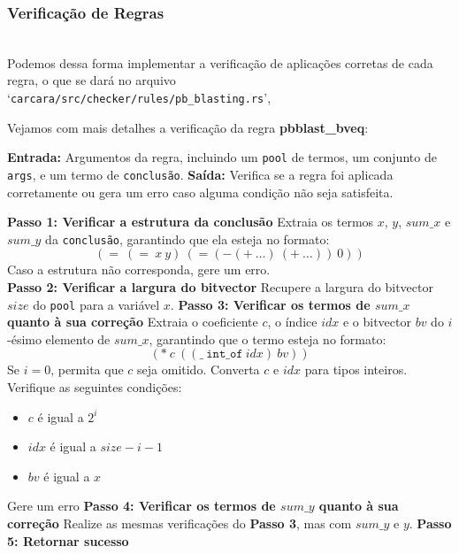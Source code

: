 \documentclass[conference]{IEEEtran}
\begin{document}
\subsubsection{Verificação de Regras}
\noindent\\
Podemos dessa forma implementar a verificação de aplicações corretas de cada regra, o que se
dará no arquivo\\ `\texttt{carcara/src/checker/rules/pb\_blasting.rs}',

Vejamos com mais detalhes a verificação da regra \textbf{pbblast\_bveq}:
\begin{algorithmic}[1]
    \Statex \textbf{Entrada:} Argumentos da regra, incluindo um \texttt{pool} de termos, um conjunto de \texttt{args}, e um termo de \texttt{conclusão}.
    \Statex \textbf{Saída:} Verifica se a regra foi aplicada corretamente ou gera um erro caso alguma condição não seja satisfeita.


    \State \textbf{Passo 1: Verificar a estrutura da conclusão}
    \State Extraia os termos $x$, $y$, $sum\_x$ e $sum\_y$ da \texttt{conclusão},
    garantindo que ela esteja no formato:
    \[
        (=\ (=\ x\ y)\ (= (- (+\ \ldots)\ (+\ \ldots))\ 0))
    \]
    Caso a estrutura não corresponda, gere um erro.\\

    \State \textbf{Passo 2: Verificar a largura do bitvector}
    \State Recupere a largura do bitvector $size$ do \texttt{pool} para a variável $x$.
    \State \textbf{Passo 3: Verificar os termos de $sum\_x$ quanto à sua correção}
    \State Extraia o coeficiente $c$, o índice $idx$ e o bitvector $bv$ do $i$-ésimo elemento de $sum\_x$, garantindo que o termo esteja no formato:
    \[
        (*\ c\ ((\_\ \texttt{int\_of}\ idx)\ bv))
    \]
    Se $i = 0$, permita que $c$ seja omitido.
    \State Converta $c$ e $idx$ para tipos inteiros.
    \State Verifique as seguintes condições:
    \begin{itemize}
        \item $c$ é igual a $2^i$
        \item $idx$ é igual a $size - i - 1$
        \item $bv$ é igual a $x$
    \end{itemize}
    \State Gere um erro
    \EndIf
    \EndFor
    \State \textbf{Passo 4: Verificar os termos de $sum\_y$ quanto à sua correção}
    \State Realize as mesmas verificações do \textbf{Passo 3}, mas com $sum\_y$ e $y$.
    \State \textbf{Passo 5: Retornar sucesso}
    \EndProcedure
\end{algorithmic}
\end{document}
